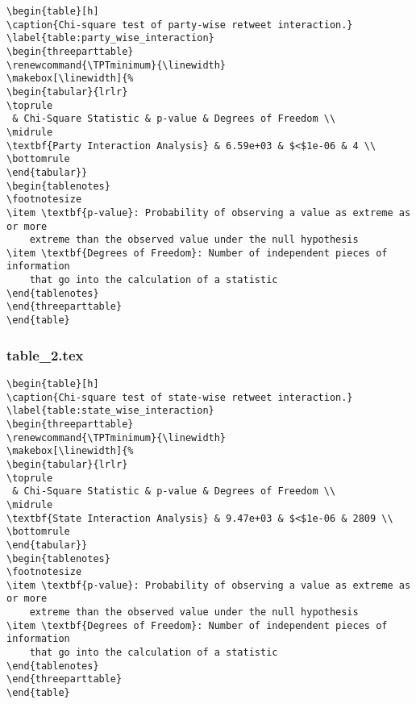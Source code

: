 \documentclass[11pt]{article}
\begin{document}
\begin{Verbatim}[tabsize=4]
\begin{table}[h]
\caption{Chi-square test of party-wise retweet interaction.}
\label{table:party_wise_interaction}
\begin{threeparttable}
\renewcommand{\TPTminimum}{\linewidth}
\makebox[\linewidth]{%
\begin{tabular}{lrlr}
\toprule
 & Chi-Square Statistic & p-value & Degrees of Freedom \\
\midrule
\textbf{Party Interaction Analysis} & 6.59e+03 & $<$1e-06 & 4 \\
\bottomrule
\end{tabular}}
\begin{tablenotes}
\footnotesize
\item \textbf{p-value}: Probability of observing a value as extreme as or more
	extreme than the observed value under the null hypothesis
\item \textbf{Degrees of Freedom}: Number of independent pieces of information
	that go into the calculation of a statistic
\end{tablenotes}
\end{threeparttable}
\end{table}

\end{Verbatim}

\subsubsection*{table\_2.tex}

\begin{Verbatim}[tabsize=4]
\begin{table}[h]
\caption{Chi-square test of state-wise retweet interaction.}
\label{table:state_wise_interaction}
\begin{threeparttable}
\renewcommand{\TPTminimum}{\linewidth}
\makebox[\linewidth]{%
\begin{tabular}{lrlr}
\toprule
 & Chi-Square Statistic & p-value & Degrees of Freedom \\
\midrule
\textbf{State Interaction Analysis} & 9.47e+03 & $<$1e-06 & 2809 \\
\bottomrule
\end{tabular}}
\begin{tablenotes}
\footnotesize
\item \textbf{p-value}: Probability of observing a value as extreme as or more
	extreme than the observed value under the null hypothesis
\item \textbf{Degrees of Freedom}: Number of independent pieces of information
	that go into the calculation of a statistic
\end{tablenotes}
\end{threeparttable}
\end{table}

\end{Verbatim}




\end{document}
